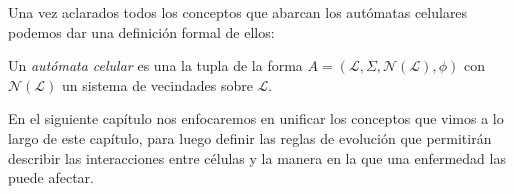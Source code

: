 Una vez aclarados todos los conceptos que abarcan los autómatas celulares podemos dar una definición formal de ellos:

\begin{definition}\label{def:automataCelular}
Un \textit{autómata celular} es una la tupla de la forma  $A=(\mathcal{L},\Sigma,\mathcal{N}(\mathcal{L}),\phi)$ con $\mathcal{N}(\mathcal{L})$ un sistema de vecindades sobre $\mathcal{L}$.
\end{definition}

En el siguiente capítulo nos enfocaremos en unificar los conceptos que vimos a lo largo de este capítulo, para luego definir las reglas de evolución que permitirán describir las interacciones entre células y la manera en la que una enfermedad las puede afectar.